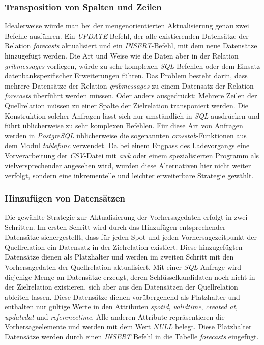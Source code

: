 \subsubsection{Transposition von Spalten und Zeilen}
Idealerweise würde man bei der mengenorientierten Aktualisierung genau
zwei Befehle ausführen. Ein \textit{UPDATE}-Befehl, der alle
existierenden Datensätze der Relation \textit{forecasts} aktualisiert
und ein \textit{INSERT}-Befehl, mit dem neue Datensätze hinzugefügt
werden. Die Art und Weise wie die Daten aber in der Relation
\textit{grib\textunderscore messages} vorliegen, würde zu sehr
komplexen \textit{SQL} Befehlen oder dem Einsatz datenbankspezifischer
Erweiterungen führen. Das Problem besteht darin, dass mehrere
Datensätze der Relation \textit{grib\textunderscore messages} zu einem
Datensatz der Relation \textit{forecasts} überführt werden
müssen. Oder anders ausgedrückt: Mehrere Zeilen der Quellrelation
müssen zu einer Spalte der Zielrelation transponiert werden. Die
Konstruktion solcher Anfragen lässt sich nur umständlich in
\textit{SQL} ausdrücken und führt üblicherweise zu sehr komplexen
Befehlen. Für diese Art von Anfragen werden in \textit{PostgreSQL}
üblicherweise die sogenannten \textit{crosstab}-Funktionen aus dem
Modul \textit{tablefunc} verwendet. Da bei einem Engpass des
Ladevorgangs eine Vorverarbeitung der \textit{CSV}-Datei mit
\textit{awk} oder einem spezialisierten Programm als
vielversprechender angesehen wird, wurden diese Alternativen hier
nicht weiter verfolgt, sondern eine inkrementelle und leichter
erweiterbare Strategie gewählt.

\subsubsection{Hinzufügen von Datensätzen}
Die gewählte Strategie zur Aktualisierung der Vorhersagedaten erfolgt
in zwei Schritten. Im ersten Schritt wird durch das Hinzufügen
entsprechender Datensätze sichergestellt, dass für jeden Spot und
jeden Vorhersagezeitpunkt der Quellrelation ein Datensatz in der
Zielrelation existiert. Diese hinzugefügten Datensätze dienen als
Platzhalter und werden im zweiten Schritt mit den Vorhersagedaten der
Quellrelation aktualisiert. Mit einer \textit{SQL}-Anfrage wird
diejenige Menge an Datensätze erzeugt, deren Schlüsselkandidaten noch
nicht in der Zielrelation existieren, sich aber aus den Datensätzen
der Quellrelation ableiten lassen. Diese Datensätze dienen
vorübergehend als Platzhalter und enthalten nur gültige Werte in den
Attributen \textit{spot\textunderscore id},
\textit{valid\textunderscore time}, \textit{created\textunderscore
  at}, \textit{updated\textunderscore at} und
\textit{reference\textunderscore time}. Alle anderen Attribute
repräsentieren die Vorhersageelemente und werden mit dem Wert
\textit{NULL} belegt. Diese Platzhalter Datensätze werden durch einen
\textit{INSERT} Befehl in die Tabelle \textit{forecasts} eingefügt.

